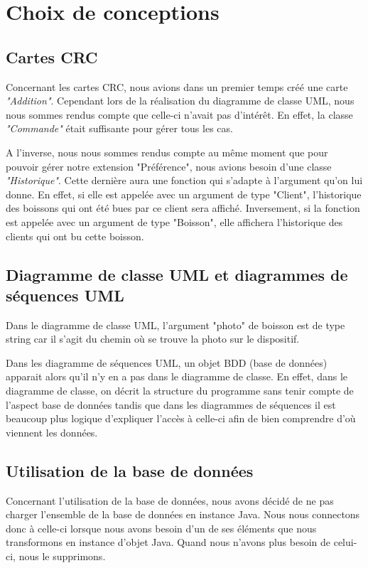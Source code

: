 \documentclass[11pt, a4, oneside, headings=normal]{scrreprt}
\begin{document}
\section*{Choix de conceptions}

\subsection*{Cartes CRC}

Concernant les cartes CRC, nous avions dans un premier temps créé une carte \textit{"Addition"}. Cependant lors de la réalisation du diagramme de classe UML, nous nous sommes rendus compte que celle-ci n'avait pas d'intérêt. En effet, la classe \textit{"Commande"} était suffisante pour gérer tous les cas.

A l'inverse, nous nous sommes rendus compte au même moment que pour pouvoir gérer notre extension "Préférence", nous avions besoin d'une classe \textit{"Historique"}. Cette dernière aura une fonction qui s'adapte à l'argument qu'on lui donne. En effet, si elle est appelée avec un argument de type "Client", l'historique des boissons qui ont été bues par ce client sera affiché. Inversement, si la fonction est appelée avec un argument de type "Boisson", elle affichera l'historique des clients qui ont bu cette boisson.

\subsection*{Diagramme de classe UML et diagrammes de séquences UML}

Dans le diagramme de classe UML, l'argument "photo" de boisson est de type string car il s'agit du chemin où se trouve la photo sur le dispositif.

Dans les diagramme de séquences UML, un objet BDD (base de données) apparait alors qu'il n'y en a pas dans le diagramme de classe.
En effet, dans le diagramme de classe, on décrit la structure du programme sans tenir compte de l'aspect base de données tandis que dans les diagrammes de séquences il est beaucoup plus logique d'expliquer l'accès à celle-ci afin de bien comprendre d'où viennent les données.

\subsection*{Utilisation de la base de données}

Concernant l'utilisation de la base de données, nous avons décidé de ne pas charger l'ensemble de la base de données en instance Java. Nous nous connectons donc à celle-ci lorsque nous avons besoin d'un de ses éléments que nous transformons en instance d'objet Java. Quand nous n'avons plus besoin de celui-ci, nous le supprimons.
\end{document}

